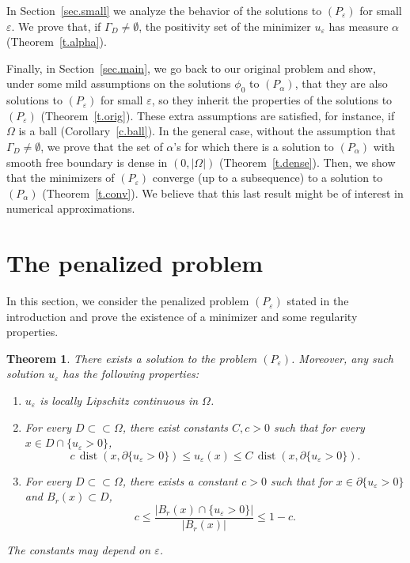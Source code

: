\documentclass[11pt]{amsart}
\newtheorem{theorem}{Theorem}[section]
\theoremstyle{definition}
\theoremstyle{remark}
\numberwithin{equation}{section}
\DeclareMathOperator{\dist}{dist}
\begin{document}
In Section~\ref{sec.small} we analyze the behavior of the solutions to $(P_\varepsilon)$ for small $\varepsilon$. We prove that, if $\Gamma_D\neq\emptyset$, the positivity set of the minimizer $u_\varepsilon$ has measure $\alpha$ (Theorem~\ref{t.alpha}).

Finally, in Section~\ref{sec.main}, we go back to our original problem and show, under some mild assumptions on the solutions $\phi_0$ to $(P_\alpha)$, that they are also solutions to $(P_\varepsilon)$ for small $\varepsilon$, so they inherit the properties of the solutions to $(P_\varepsilon)$ (Theorem~\ref{t.orig}). These extra assumptions are satisfied, for instance, if $\Omega$ is a ball (Corollary~\ref{c.ball}). In the general case, without the assumption that $\Gamma_D\neq\emptyset$, we prove that the set of $\alpha$'s for which there is a solution to $(P_\alpha)$ with smooth free boundary is dense in $(0,|\Omega|)$ (Theorem~\ref{t.dense}). Then, we show that the minimizers of $(P_\varepsilon)$ converge (up to a subsequence) to a solution to $(P_\alpha)$ (Theorem~\ref{t.conv}). We believe that this last result might be of interest in numerical approximations.

\section{The penalized problem}\label{sec.pen}

In this section, we consider the penalized problem $(P_\varepsilon)$ stated in the introduction and prove the existence of a minimizer and some regularity properties.

\begin{theorem}\label{t.reg}
There exists a solution to the problem $(P_\varepsilon)$. Moreover, any such solution $u_\varepsilon$ has the following properties:
\begin{enumerate}
\item $u_\varepsilon$ is locally Lipschitz continuous in $\Omega$.
\item For every $D\subset\subset\Omega$, there exist constants $C,c>0$ such that for every $x\in D\cap\{u_\varepsilon>0\}$,
\[
c\,\dist(x,\partial\{u_\varepsilon>0\})\le u_\varepsilon(x)\le C\,\dist(x,\partial\{u_\varepsilon>0\}).
\]
\item For every $D\subset\subset\Omega$, there exists a constant $c>0$ such that for $x\in\partial\{u_\varepsilon>0\}$ and $B_r(x)\subset D$,
\[
c\le\frac{|B_r(x)\cap\{u_\varepsilon>0\}|}{|B_r(x)|}\le1-c.
\]
\end{enumerate}
The constants may depend on $\varepsilon$.
\end{theorem}
\end{document}

